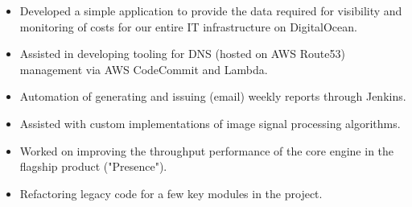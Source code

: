 \documentclass[10pt,a4paper,ragged2e,withhyper]{altacv}
\begin{document}
\begin{paracol}{2}
\begin{itemize}
                \item Developed a simple application to provide the data required for visibility and monitoring of costs for our entire IT infrastructure on DigitalOcean.
                \item Assisted in developing tooling for DNS (hosted on AWS Route53) management via AWS CodeCommit and Lambda.
                \item Automation of generating and issuing (email) weekly reports through Jenkins.
            \end{itemize}

        \divider
        
            \begin{itemize}
                \item Assisted with custom implementations of image signal processing algorithms.
                \item Worked on improving the throughput performance of the core engine in the flagship product ("Presence").
                \item Refactoring legacy code for a few key modules in the project.
            \end{itemize}
        
        \switchcolumn
        
        
            
              \\
             \\
            \vspace{5pt}
            
            \divider
            
            
            
            \divider
            

\end{paracol}
\end{document}
